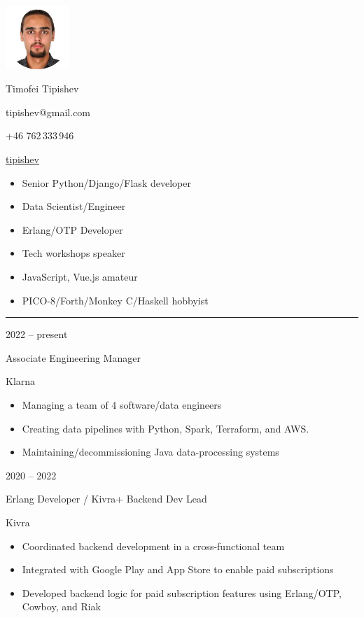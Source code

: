 \documentclass[a4paper,10pt]{article}
\newlength{\cvcolumngapwidth}
\newlength{\cvleftcolumnwidth}
\newlength{\cvrightcolumnwidth}
\newcommand{\cvnamestyle}[1]{{\Large\cvnamefont\textcolor{cvnamecolor}{#1}}}
\newcommand{\cvsectionstyle}[1]{{\normalsize\cvsectionfont\textcolor{cvsectioncolor}{#1}}}
\newcommand{\cvtitlestyle}[1]{{\large\cvtitlefont\textcolor{cvtitlecolor}{#1}}}
\newcommand{\cvdurationstyle}[1]{{\small\cvdurationfont\textcolor{cvdurationcolor}{#1}}}
\newlength{\cvafteritemskipamount}
\newlength{\cvaftersectionskipamount}
\newlength{\cvafternameskipamount}
\newlength{\cvafterpersonalinfolineskipamount}
\newlength{\cvaftertitleskipamount}
\newlength{\cvparskip}
\newcommand{\cvpersonalinfo}[3]{
    \begin{minipage}[t]{\cvleftcolumnwidth}
        \vspace{0mm} %
        \raggedleft #1
    \end{minipage}%
    \hspace{\cvcolumngapwidth}%
    \begin{minipage}[t]{60mm}
        \vspace{0mm} %
        #2
    \end{minipage}
    \begin{minipage}[t]{70mm}
        \vspace{0mm} %
	#3
    \end{minipage}

    \vspace{\cvafteritemskipamount}
}
\newcommand{\cvname}[1]{
    \cvnamestyle{#1}

    \vspace{\cvafternameskipamount}
}
\newcommand{\cvpersonalinfolinewithicon}[3]{
    \raisebox{.5\fontcharht\font`E-.5\height}{\texttt{[image: \#2]}}
    #3

    \vspace{\cvafterpersonalinfolineskipamount}
}
\newcommand{\cvsection}[1]{
    \begin{minipage}[t]{\cvleftcolumnwidth}
        \raggedleft\cvsectionstyle{#1}
    \end{minipage}%
    \hspace{\cvcolumngapwidth}%
    \begin{minipage}[t]{\cvrightcolumnwidth}
        \textcolor{cvrulecolor}{\rule{\cvrightcolumnwidth}{0.3mm}}
    \end{minipage}

    \vspace{\cvaftersectionskipamount}
}
\newcommand{\cvitem}[2]{
    \begin{minipage}[t]{\cvleftcolumnwidth}
        \raggedleft #1
    \end{minipage}%
    \hspace{\cvcolumngapwidth}%
    \begin{minipage}[t]{\cvrightcolumnwidth}
        \setlength{\parskip}{\cvparskip} #2
    \end{minipage}

    \vspace{\cvafteritemskipamount}
}
\newcommand{\cvtitle}[1]{
    \cvtitlestyle{#1}

    \vspace{\cvaftertitleskipamount}
    \vspace{-\cvparskip}
}
\begin{document}

\cvpersonalinfo{
    \includegraphics[height=24mm]{me-circle.png}

}{
    \cvname{Timofei Tipishev}

    \cvpersonalinfolinewithicon{height=4mm}{070-envelop.pdf}{
        tipishev@gmail.com
    }


    \cvpersonalinfolinewithicon{height=4mm}{067-phone.pdf}{
        +46 762\,333\,946
    }

    \cvpersonalinfolinewithicon{height=4mm}{github.png}{
	    \href{https://github.com/tipishev}{tipishev}
    }
}{
	\begin{itemize}[leftmargin=*]
		\item Senior Python/Django/Flask developer
		\item Data Scientist/Engineer
		\item Erlang/OTP Developer
		\item Tech workshops speaker
		\item JavaScript, Vue.js amateur
		\item PICO-8/Forth/Monkey C/Haskell hobbyist
	\end{itemize}
}



\cvsection{WORK EXPERIENCE}

\cvitem{
    \cvdurationstyle{2022 -- present}
}{
    \cvtitle{Associate Engineering Manager}

    Klarna

    \begin{itemize}[leftmargin=*]
       \item Managing a team of 4 software/data engineers
       \item Creating data pipelines with Python, Spark, Terraform, and AWS.
       \item Maintaining/decommissioning Java data-processing systems
    \end{itemize}
}

\cvitem{
    \cvdurationstyle{2020 -- 2022}
}{
    \cvtitle{Erlang Developer / Kivra+ Backend Dev Lead}

    Kivra

    \begin{itemize}[leftmargin=*]
       \item Coordinated backend development in a cross-functional team
       \item Integrated with Google Play and App Store to enable paid subscriptions
       \item Developed backend logic for paid subscription features using Erlang/OTP, Cowboy, and Riak
    \end{itemize}
}
\end{document}
